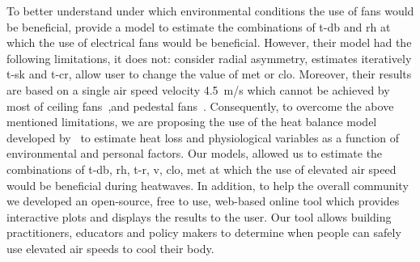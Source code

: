 To better understand under which environmental conditions the use of fans would be beneficial,  provide a model to estimate the combinations of \ac{t-db} and \ac{rh} at which the use of electrical fans would be beneficial.
However, their model had the following limitations, it does not: consider radial asymmetry, estimates iteratively \ac{t-sk} and \ac{t-cr}, allow user to change the value of \ac{met} or \ac{clo}.
Moreover, their results are based on a single air speed velocity 4.5~m/s which cannot be achieved by most of ceiling fans~\cite{Raftery2019},and pedestal fans~\cite{Yang2015a}.
Consequently, to overcome the above mentioned limitations, we are proposing the use of the heat balance model developed by~ to estimate heat loss and physiological variables as a function of environmental and personal factors.
Our models, allowed us to estimate the combinations of \ac{t-db}, \ac{rh}, \ac{t-r}, \ac{v}, \ac{clo}, \ac{met} at which the use of elevated air speed would be beneficial during heatwaves.
In addition, to help the overall community we developed an open-source, free to use, web-based online tool which provides interactive plots and displays the results to the user.
Our tool allows building practitioners, educators and policy makers to determine when people can safely use elevated air speeds to cool their body.